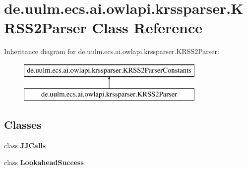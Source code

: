 \hypertarget{classde_1_1uulm_1_1ecs_1_1ai_1_1owlapi_1_1krssparser_1_1_k_r_s_s2_parser}{\section{de.\-uulm.\-ecs.\-ai.\-owlapi.\-krssparser.\-K\-R\-S\-S2\-Parser Class Reference}
\label{classde_1_1uulm_1_1ecs_1_1ai_1_1owlapi_1_1krssparser_1_1_k_r_s_s2_parser}
}
Inheritance diagram for de.\-uulm.\-ecs.\-ai.\-owlapi.\-krssparser.\-K\-R\-S\-S2\-Parser\-:\begin{figure}[H]
\begin{center}
\leavevmode
\includegraphics[height=2.000000cm]{classde_1_1uulm_1_1ecs_1_1ai_1_1owlapi_1_1krssparser_1_1_k_r_s_s2_parser}
\end{center}
\end{figure}
\subsection*{Classes}
\begin{DoxyCompactItemize}
\item 
class {\bfseries J\-J\-Calls}
\item 
class {\bfseries Lookahead\-Success}
\end{DoxyCompactItemize}
